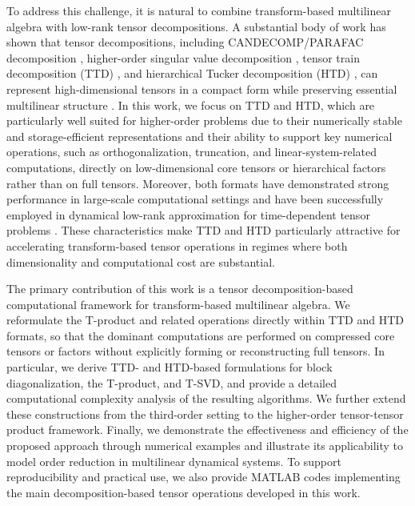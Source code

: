 \documentclass[onefignum,onetabnum]{siamart250211}
\begin{document}
To address this challenge, it is natural to combine transform-based multilinear algebra with low-rank tensor decompositions. A substantial body of work has shown that tensor decompositions, including CANDECOMP/PARAFAC decomposition \cite{bader2008efficient,kolda2009tensor}, higher-order singular value decomposition \cite{5447070,de2000multilinear}, tensor train decomposition (TTD) \cite{oseledets2011tensor,oseledets2009breaking}, and hierarchical Tucker decomposition (HTD) \cite{grasedyck2010hierarchical}, can represent high-dimensional tensors in a compact form while preserving essential multilinear structure \cite{tokcan2026tensor}. In this work, we focus on TTD and HTD, which are particularly well suited for higher-order problems due to their numerically stable and storage-efficient representations and their ability to support key numerical operations, such as orthogonalization, truncation, and linear-system-related computations, directly on low-dimensional core tensors or hierarchical factors rather than on full tensors. Moreover, both formats have demonstrated strong performance in large-scale computational settings and have been successfully employed in dynamical low-rank approximation for time-dependent tensor problems \cite{lubich2013dynamical,mao2025tensor}. These characteristics make TTD and HTD particularly attractive for accelerating transform-based tensor operations in regimes where both dimensionality and computational cost are substantial.


The primary contribution of this work is a tensor decomposition-based computational framework for transform-based multilinear algebra. We reformulate the T-product and related operations directly within TTD and HTD formats, so that the dominant computations are performed on compressed core tensors or factors without explicitly forming or reconstructing full tensors. In particular, we derive TTD- and HTD-based formulations for block diagonalization, the T-product, and T-SVD, and provide a detailed computational complexity analysis of the resulting algorithms. We further extend these constructions from the third-order setting to the higher-order tensor-tensor product framework. Finally, we demonstrate the effectiveness and efficiency of the proposed approach through numerical examples and illustrate its applicability to model order reduction in multilinear dynamical systems. To support reproducibility and practical use, we also provide MATLAB codes implementing the main decomposition-based tensor operations developed in this work.
\end{document}

